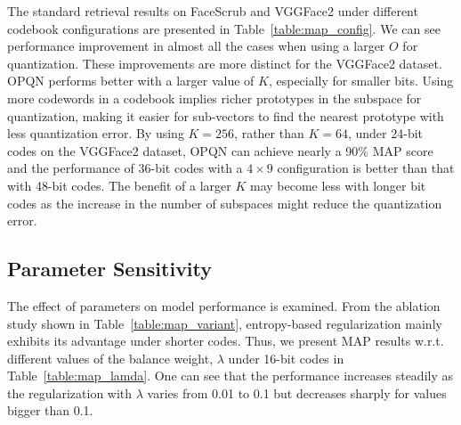 \documentclass{elsarticle}
\begin{document}
The standard retrieval results on FaceScrub and VGGFace2 under different codebook configurations are presented in Table~\ref{table:map_config}. We can see performance improvement in almost all the cases when using a larger $O$ for quantization. These improvements are more distinct for the VGGFace2 dataset. OPQN performs better with a larger value of $K$, especially for smaller bits. Using more codewords in a codebook implies richer prototypes in the subspace for quantization, making it easier for sub-vectors to find the nearest prototype with less quantization error. By using $K=256$, rather than $K=64$, under 24-bit codes on the VGGFace2 dataset, OPQN can achieve nearly a 90$\%$ MAP score and the performance of 36-bit codes with a $4 \times 9$ configuration is better than that with 48-bit codes. The benefit of a larger $K$ may become less with longer bit codes as the increase in the number of subspaces might reduce the quantization error.

\subsection{Parameter Sensitivity}
The effect of parameters on model performance is examined. From the ablation study shown in Table~\ref{table:map_variant}, entropy-based regularization mainly exhibits its advantage under shorter codes. Thus, we present MAP results w.r.t. different values of the balance weight, $\lambda$ under 16-bit codes in Table~\ref{table:map_lamda}. One can see that the performance increases steadily as the regularization with $\lambda$ varies from 0.01 to 0.1 but decreases sharply for values bigger than 0.1.

{\linespread{1.2}
\begin{table}[htbp]
    \centering
    \small
    \caption{16-bit MAP ($\%$) results w.r.t. different values of $\lambda$}
    \label{table:map_lamda}
\end{table}
}
\end{document}
